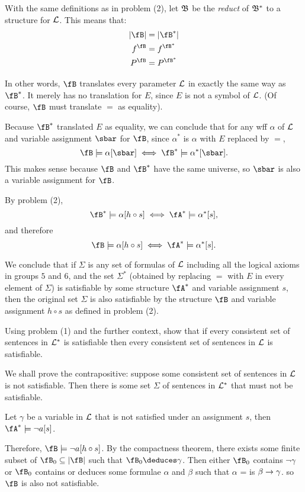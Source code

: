 \begin{problem}
  With the same definitions as in problem (2),
  let $\mathfrak{B}$ be the \emph{reduct} of $\mathfrak{B}^*$ to a structure
  for $\mathcal{L}$. This means that:
  \begin{align*}
    \abs{\fB} &= \abs{\fB^*} \\
    f^{\fB} &= f^{\fB^*} \\
    P^\fB &= P^{\fB^*}
  \end{align*}

  \step
  In other words, $\fB$ translates every parameter $\mathcal{L}$
  in exactly the same way as $\fB^*$.
  It merely has no translation for $E$, since $E$ is not a symbol of
  $\mathcal{L}$. (Of course, $\fB$ must translate $=$ as equality).

  \step
  Because $\fB^*$ translated $E$ as equality, we can conclude that
  for any wff $\alpha$ of $\mathcal{L}$ and variable assignment $\sbar$
  for $\fB$, since $\alpha^*$ is $\alpha$ with $E$ replaced by $=$,
  \[ \fB \models \alpha [\sbar ] \Iff \fB^* \models \alpha^*[\sbar]. \]
  This makes sense because $\fB$ and $\fB^*$ have the same universe,
  so $\sbar$ is also a variable assignment for $\fB$.

  \step
  By problem (2),
  \[ \fB^* \models \alpha [h \circ s] \Iff \fA^* \models \alpha^* [s], \]
  and therefore
  \[ \fB \models \alpha [h \circ s] \Iff \fA^* \models \alpha^* [s]. \]

  \step
  We conclude that if $\Sigma$ is any set of formulas of $\mathcal{L}$
  including all the logical axioms in groups $5$ and $6$,
  and the set $\Sigma^*$ (obtained by replacing $=$ with $E$
  in every element of $\Sigma$) is satisfiable
  by some structure $\fA^*$ and variable assignment $s$,
  then the original set $\Sigma$ is also satisfiable by the structure
  $\fB$ and variable assignment $h \circ s$ as defined in problem (2).

  \step
  Using problem (1) and the further context, show that if every consistent
  set of sentences in $\mathcal{L}^*$ is satisfiable then every consistent set of
  sentences in $\mathcal{L}$ is satisfiable.
  
  \begin{Answer}
    We shall prove the contrapositive:
    suppose some consistent set of sentences in $\mathcal{L}$
    is not satisfiable. Then there is some set $\Sigma$ of sentences
    in $\mathcal{L}^*$ that must not be satisfiable.

    \step
    Let $\gamma$ be a variable in $\mathcal{L}$ that is not satisfied under an
    assignment $s$, then $\fA^* \models \lnot a [s]$.

    \step
    Therefore, $\fB \models \lnot a [h \circ s]$.
    By the compactness theorem, there exists some finite subset
    of $\fB_0 \subseteq \abs{\fB}$ such that $\fB_0 \deduces \gamma$.
    Then either $\fB_0$ contains $\lnot \gamma$ or $\fB_0$ contains
    or deduces some formulae $\alpha$ and $\beta$
    such that $\alpha$ = is $\beta \rightarrow \gamma$.
    so $\fB$ is also not satisfiable.
  \end{Answer}
\end{problem}
